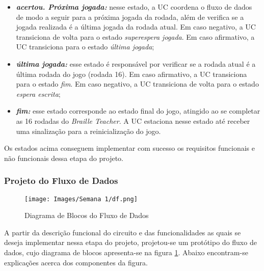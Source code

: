 \documentclass[amsmath,amssymb,floatfix]{report}
\begin{document}
\begin{itemize}
    \item \textbf{\textit{acertou. Próxima jogada:}} nesse estado, a UC coordena o fluxo de dados de modo a seguir para a próxima jogada da rodada, além de verifica se a jogada realizada é a última jogada da rodada atual. Em caso negativo, a UC transiciona de volta para o estado \textit{superespera jogada}. Em caso afirmativo, a UC transiciona para o estado \textit{última jogada};
    \item \textbf{\textit{última jogada:}} esse estado é responsável por verificar se a rodada atual é a última rodada do jogo (rodada 16). Em caso afirmativo, a UC transiciona para o estado \textit{fim}. Em caso negativo, a UC transiciona de volta para o estado \textit{espera escrita};
    \item \textbf{\textit{fim:}} esse estado corresponde ao estado final do jogo, atingido ao se completar as 16 rodadas do \textit{Braille Teacher}. A UC estaciona nesse estado até receber uma sinalização para a reinicialização do jogo.
\end{itemize}

Os estados acima conseguem implementar com sucesso os requisitos funcionais e não funcionais dessa etapa do projeto.


\subsubsection{Projeto do Fluxo de Dados}
\label{subsubsec:df1}

\begin{figure}[H]
    \centering
    \texttt{[image: Images/Semana 1/df.png]}
    \caption{Diagrama de Blocos do Fluxo de Dados}
    \label{fig:df}
\end{figure}

A partir da descrição funcional do circuito e das funcionalidades as quais se deseja implementar nessa etapa do projeto, projetou-se um protótipo do fluxo de dados, cujo diagrama de blocos apresenta-se na figura \ref{fig:df}. Abaixo encontram-se explicações acerca dos componentes da figura.
\end{document}
